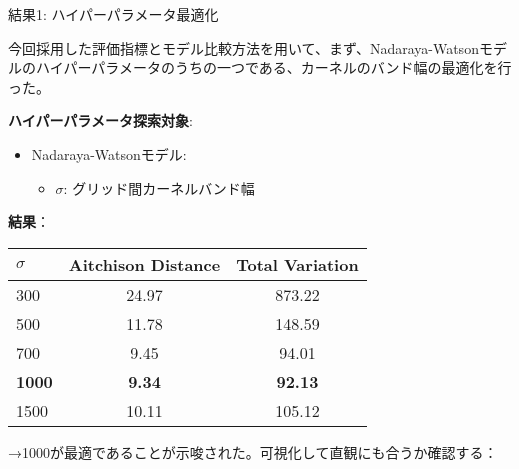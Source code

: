 \documentclass[xelatex, 8pt]{beamer}
\theoremstyle{plain}
\theoremstyle{definition}
\begin{document}
\begin{frame}{結果1: ハイパーパラメータ最適化}

    今回採用した評価指標とモデル比較方法を用いて、まず、Nadaraya-Watsonモデルのハイパーパラメータのうちの一つである、カーネルのバンド幅の最適化を行った。

    \vspace{4mm}

    \textbf{ハイパーパラメータ探索対象}:
    \begin{itemize}
        \item Nadaraya-Watsonモデル:
        \begin{itemize}
            \item $\sigma$: グリッド間カーネルバンド幅
        \end{itemize}
    \end{itemize}

    \vspace{5mm}

    \textbf{結果}：
    \begin{table}
        \centering
        \begin{tabular}{l|cc}
            \hline
            $\sigma$ & Aitchison Distance & Total Variation \\
            \hline
            300 & 24.97 & 873.22 \\
            500 & 11.78 & 148.59 \\
            700 & 9.45 & 94.01 \\
            \textbf{1000} & \textbf{9.34} & \textbf{92.13} \\
            1500 & 10.11 & 105.12 \\
            \hline
        \end{tabular}
    \end{table}

    \vspace{3mm}
    →1000が最適であることが示唆された。可視化して直観にも合うか確認する：

\end{frame}
\end{document}
